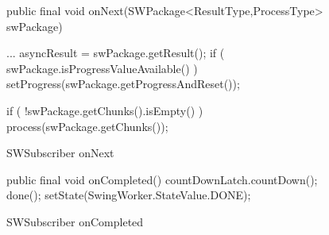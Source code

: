 \begin{figure}[H]
\begin{minipage}{0.61\textwidth}
\begin{sourcecode}
\begin{javacode}{}
public final void onNext(SWPackage<ResultType,ProcessType> swPackage){
	...
	asyncResult = swPackage.getResult();
	if ( swPackage.isProgressValueAvailable() )
		setProgress(swPackage.getProgressAndReset());

	if ( !swPackage.getChunks().isEmpty() )
		process(swPackage.getChunks());
}
\end{javacode}
\caption{SWSubscriber onNext}
\label{code:swsubscriber-onnext}
\end{sourcecode}
\end{minipage}\hspace{0.65cm}
\begin{minipage}{0.35\textwidth}
\begin{sourcecode}
\begin{javacode}{}
public final void onCompleted() { 
	countDownLatch.countDown();
	done();
	setState(SwingWorker.StateValue.DONE);
}
\end{javacode}
\caption{SWSubscriber onCompleted}
\label{code:swsubscriber-oncompleted}
\end{sourcecode}
\end{minipage}
\end{figure}
